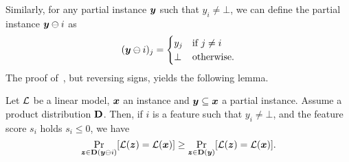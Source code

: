 Similarly, for any partial instance ${\bm{y}}$ such that $y_i \neq \bot$, we can define the partial instance ${\bm{y}} \ominus i$ as 
\[ 
    ({\bm{y}} \ominus i)_j = \begin{cases}
        y_j & \text{if } j \neq i\\
        \bot & \text{otherwise}.
    \end{cases}
\]
The proof of~, but reversing signs, yields the following lemma. 
\begin{lemma}\label{lemma:negative-score}
    Let $\mathcal{L}$ be a linear model, ${\bm{x}}$ an instance and ${\bm{y}} \subseteq {\bm{x}}$ a partial instance. Assume a product distribution $\mathbf{D}$. Then, if $i$ is a feature such that $y_i \neq \bot$, and the feature score $s_i$ holds $s_i \leq 0$, we have 
\[ 
\Pr_{{\bm{z}} \in \mathbf{D}({\bm{y}} \ominus i)}[\mathcal{L}({\bm{z}}) = \mathcal{L}({\bm{x}})] \geq \Pr_{{\bm{z}} \in \mathbf{D}({\bm{y}})}[\mathcal{L}({\bm{z}}) = \mathcal{L}({\bm{x}})].
\]

\end{lemma}

